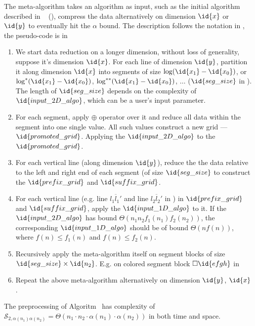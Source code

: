 
The meta-algorithm takes an algorithm as input, such as the initial
algorithm described in ~ (),
compress the data alternatively on dimension $\id{x}$ or $\id{y}$ to
eventually hit the $\alpha$ bound. The description follows the notation
in , the pseudo-code is in 

\begin{enumerate}
\item We start data reduction on a longer dimension,
  without loss of generality, suppose it's dimension $\id{x}$. For
  each line of dimension $\id{y}$, partition it along dimension
  $\id{x}$ into segments of size $\log (\id{x_1} - \id{x_0})$, or
  $\log^* (\id{x_1} - \id{x_0})$, $\log^{**} (\id{x_1} - \id{x_0})$,
  $\ldots$ ($\id{seg\_size}$ in ). The length of
  $\id{seg\_size}$ depends on the complexity of $\id{input\_2D\_algo}$,
  which can be a user's input parameter.
\item For each segment, apply $\oplus$ operator over it and reduce
  all data within the segment into one single value. All such values
  construct a new grid --- $\id{promoted\_grid}$. Applying the
  $\id{input\_2D\_algo}$ to the $\id{promoted\_grid}$.
\item For each vertical line (along dimension $\id{y}$), reduce the
  the data relative to the left and right end of each segment (of
  size $\id{seg\_size}$ to construct the $\id{prefix\_grid}$ and
  $\id{suffix\_grid}$.
\item For each vertical line (e.g. line $\overline{l_1l_1'}$ and
  line $\overline{l_2l_2'}$ in ) in $\id{prefix\_grid}$
  and $\id{suffix\_grid}$, apply the $\id{input\_1D\_algo}$ to it.
  If the $\id{input\_2D\_algo}$ has bound $\Theta(n_1 n_2 f_1(n_1)
  f_2(n_2))$, the corresponding $\id{input\_1D\_algo}$ should be of
  bound $\Theta(n f(n))$, where $f(n) \leq f_1(n)$ and $f(n) \leq f_2(n)$.
\item Recursively apply the meta-algorithm itself on segment blocks
  of size $\id{seg\_size} \times \id{n_2}$. E.g. on colored segment block
  $\Box \id{efgh}$ in 
\item Repeat the above meta-algorithm alternatively on dimension
  $\id{y}$, $\id{x}$.
\end{enumerate}

\begin{theorem}
The preprocessing of Algoritm~ has complexity of 
$\mathcal{S}_{2, \alpha(n_1) \alpha(n_2)} = \Theta(n_1
\cdot n_2 \cdot \alpha (n_1) \cdot \alpha(n_2))$ in both time and space.
\label{thm:meta-2D-pp}
\end{theorem}


